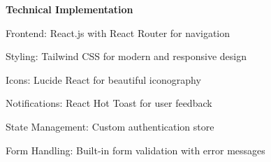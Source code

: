 \documentclass{article}
\begin{document}
\vspace{0.5cm}

\begin{center}
    \textbf{Technical Implementation}
\end{center}

\begin{highlights}
    \item Frontend: React.js with React Router for navigation
    \item Styling: Tailwind CSS for modern and responsive design
    \item Icons: Lucide React for beautiful iconography
    \item Notifications: React Hot Toast for user feedback
    \item State Management: Custom authentication store
    \item Form Handling: Built-in form validation with error messages
\end{highlights}
\end{document}
